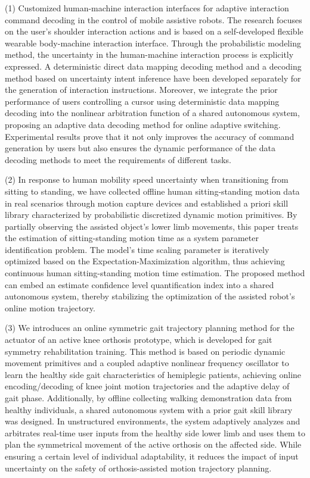 \begin{abstract*}
(1) Customized human-machine interaction interfaces for adaptive interaction command decoding in the control of mobile assistive robots. The research focuses on the user's shoulder interaction actions and is based on a self-developed flexible wearable body-machine interaction interface. Through the probabilistic modeling method, the uncertainty in the human-machine interaction process is explicitly expressed. A deterministic direct data mapping decoding method and a decoding method based on uncertainty intent inference have been developed separately for the generation of interaction instructions. Moreover, we integrate the prior performance of users controlling a cursor using deterministic data mapping decoding into the nonlinear arbitration function of a shared autonomous system, proposing an adaptive data decoding method for online adaptive switching. Experimental results prove that it not only improves the accuracy of command generation by users but also ensures the dynamic performance of the data decoding methods to meet the requirements of different tasks.

(2) In response to human mobility speed uncertainty when transitioning from sitting to standing, we have collected offline human sitting-standing motion data in real scenarios through motion capture devices and established a priori skill library characterized by probabilistic discretized dynamic motion primitives. By partially observing the assisted object's lower limb movements, this paper treats the estimation of sitting-standing motion time as a system parameter identification problem. The model's time scaling parameter is iteratively optimized based on the Expectation-Maximization algorithm, thus achieving continuous human sitting-standing motion time estimation. The proposed method can embed an estimate confidence level quantification index into a shared autonomous system, thereby stabilizing the optimization of the assisted robot's online motion trajectory.

(3) We introduces an online symmetric gait trajectory planning method for the actuator of an active knee orthosis prototype, which is developed for gait symmetry rehabilitation training. This method is based on periodic dynamic movement primitives and a coupled adaptive nonlinear frequency oscillator to learn the healthy side gait characteristics of hemiplegic patients, achieving online encoding/decoding of knee joint motion trajectories and the adaptive delay of gait phase. Additionally, by offline collecting walking demonstration data from healthy individuals, a shared autonomous system with a prior gait skill library was designed. In unstructured environments, the system adaptively analyzes and arbitrates real-time user inputs from the healthy side lower limb and uses them to plan the symmetrical movement of the active orthosis on the affected side. While ensuring a certain level of individual adaptability, it reduces the impact of input uncertainty on the safety of orthosis-assisted motion trajectory planning.
\end{abstract*}
